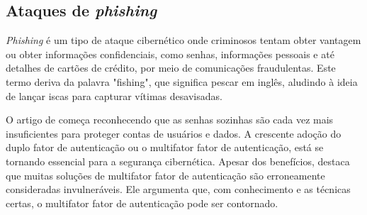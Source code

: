\documentclass[12pt]{article}
\begin{document}
\subsection{Ataques de \textit{phishing}}

\textit{Phishing} é um tipo de ataque cibernético onde criminosos tentam obter
vantagem ou obter informações confidenciais, como senhas, informações
pessoais e até detalhes de cartões de crédito, por meio de comunicações
fraudulentas.
Este termo deriva da palavra "fishing", que significa pescar em inglês,
aludindo à ideia de lançar iscas para capturar vítimas desavisadas.

O artigo de \cite{article:3} começa reconhecendo que as senhas sozinhas são cada vez mais
insuficientes para proteger contas de usuários e dados.
A crescente adoção do duplo fator de autenticação ou o multifator fator de autenticação, está
se tornando essencial para a segurança cibernética.
Apesar dos benefícios, \cite{article:3} destaca que muitas soluções de multifator fator de
autenticação são erroneamente consideradas invulneráveis.
Ele argumenta que, com conhecimento e as técnicas certas, o multifator fator de autenticação
pode ser contornado.
\end{document}

